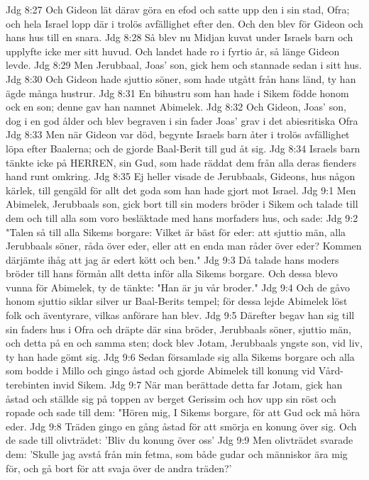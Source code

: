Jdg 8:27  Och Gideon lät därav göra en efod och satte upp den i sin stad, Ofra; och hela Israel lopp där i trolös avfällighet efter den. Och den blev för Gideon och hans hus till en snara.
Jdg 8:28  Så blev nu Midjan kuvat under Israels barn och upplyfte icke mer sitt huvud. Och landet hade ro i fyrtio år, så länge Gideon levde.
Jdg 8:29  Men Jerubbaal, Joas' son, gick hem och stannade sedan i sitt hus.
Jdg 8:30  Och Gideon hade sjuttio söner, som hade utgått från hans länd, ty han ägde många hustrur.
Jdg 8:31  En bihustru som han hade i Sikem födde honom ock en son; denne gav han namnet Abimelek.
Jdg 8:32  Och Gideon, Joas' son, dog i en god ålder och blev begraven i sin fader Joas' grav i det abiesritiska Ofra
Jdg 8:33  Men när Gideon var död, begynte Israels barn åter i trolös avfällighet löpa efter Baalerna; och de gjorde Baal-Berit till gud åt sig.
Jdg 8:34  Israels barn tänkte icke på HERREN, sin Gud, som hade räddat dem från alla deras fienders hand runt omkring.
Jdg 8:35  Ej heller visade de Jerubbaals, Gideons, hus någon kärlek, till gengäld för allt det goda som han hade gjort mot Israel.
Jdg 9:1  Men Abimelek, Jerubbaals son, gick bort till sin moders bröder i Sikem och talade till dem och till alla som voro besläktade med hans morfaders hus, och sade:
Jdg 9:2  "Talen så till alla Sikems borgare: Vilket är bäst för eder: att sjuttio män, alla Jerubbaals söner, råda över eder, eller att en enda man råder över eder? Kommen därjämte ihåg att jag är edert kött och ben."
Jdg 9:3  Då talade hans moders bröder till hans förmån allt detta inför alla Sikems borgare. Och dessa blevo vunna för Abimelek, ty de tänkte: "Han är ju vår broder."
Jdg 9:4  Och de gåvo honom sjuttio siklar silver ur Baal-Berits tempel; för dessa lejde Abimelek löst folk och äventyrare, vilkas anförare han blev.
Jdg 9:5  Därefter begav han sig till sin faders hus i Ofra och dräpte där sina bröder, Jerubbaals söner, sjuttio män, och detta på en och samma sten; dock blev Jotam, Jerubbaals yngste son, vid liv, ty han hade gömt sig.
Jdg 9:6  Sedan församlade sig alla Sikems borgare och alla som bodde i Millo och gingo åstad och gjorde Abimelek till konung vid Vård-terebinten invid Sikem.
Jdg 9:7  När man berättade detta far Jotam, gick han åstad och ställde sig på toppen av berget Gerissim och hov upp sin röst och ropade och sade till dem: "Hören mig, I Sikems borgare, för att Gud ock må höra eder.
Jdg 9:8  Träden gingo en gång åstad för att smörja en konung över sig. Och de sade till olivträdet: 'Bliv du konung över oss'
Jdg 9:9  Men olivträdet svarade dem: 'Skulle jag avstå från min fetma, som både gudar och människor ära mig för, och gå bort för att svaja över de andra träden?'
